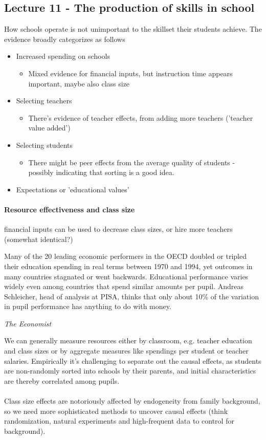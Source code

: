 \documentclass[12pt, a4paper]{article}
\begin{document}
\begin{multicols}{2}
\subsection{Lecture 11 - The production of skills in school}
How schools operate is not unimportant to the skillset their students achieve. The evidence broadly categorizes as follows 
\begin{itemize}
\item Increased spending on schools
\begin{itemize}
\item Mixed evidence for financial inputs, but instruction time appears important, maybe also class size
\end{itemize}
\item Selecting teachers
\begin{itemize}
\item There's evidence of teacher effects, from adding more teachers ('teacher value added')
\end{itemize}
\item Selecting students
\begin{itemize}
\item There might be peer effects from the average quality of students - possibly indicating that sorting is a good idea. 
\end{itemize}
\item Expectations or 'educational values'
\end{itemize}
\paragraph{Resource effectiveness and class size} financial inputs can be used to decrease class sizes, or hire more teachers (somewhat identical?) 
\epigraph{Many of the 20 leading economic performers in the OECD doubled or tripled their education spending in real terms between 1970 and 1994, yet outcomes in many countries stagnated or went backwards. Educational performance varies widely even among countries that spend similar amounts per pupil. Andreas Schleicher, head of analysis at PISA, thinks that only about 10\% of the variation in pupil performance has anything to do with money.}{\textit{The Economist}}
We can generally measure resources either by classroom, e.g. teacher education and class sizes or by aggregate measures like spendings per student or teacher salaries. Empirically it's challenging to separate out the causal effects, as students are non-randomly sorted into schools by their parents, and initial characteristics are thereby correlated among pupils. 
\\ \\
Class size effects are notoriously affected by endogeneity from family background, so we need more sophisticated methods to uncover causal effects (think randomization, natural experiments and high-frequent data to control for background). 


\end{multicols}
\end{document}

